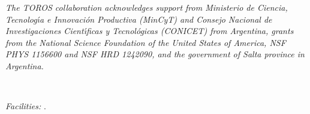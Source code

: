 \documentclass[apjl]{emulateapj}
\begin{document}
\acknowledgments
{\it The TOROS collaboration acknowledges support from Ministerio de Ciencia, Tecnolog\'{\i}a e Innovaci\'on Productiva (MinCyT) and Consejo Nacional de Investigaciones Cient\'{\i}ficas y Tecnol\'ogicas (CONICET) from Argentina, grants from the National Science Foundation of the United States of America, NSF PHYS 1156600 and NSF HRD 1242090, and the government of Salta province in Argentina.}

\ \par

{\it Facilities:} .

 

\end{document}
